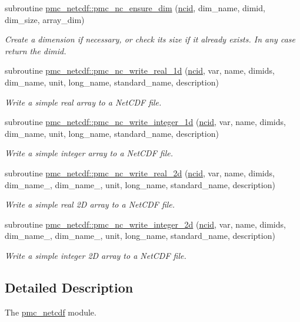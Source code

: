 \begin{DoxyCompactItemize}
subroutine \mbox{\hyperlink{namespacepmc__netcdf_aef9fac46c9e7632344fa29cfb6891f92}{pmc\+\_\+netcdf\+::pmc\+\_\+nc\+\_\+ensure\+\_\+dim}} (\mbox{\hyperlink{fractal_8_f90_a4e89f3f850921ff84a6dfce8b166ad50}{ncid}}, dim\+\_\+name, dimid, dim\+\_\+size, array\+\_\+dim)
\begin{DoxyCompactList}\small\item\em Create a dimension if necessary, or check its size if it already exists. In any case return the {\ttfamily dimid}. \end{DoxyCompactList}\item 
subroutine \mbox{\hyperlink{namespacepmc__netcdf_a8dc82ed2d6bf930ffd844ea41d821e4f}{pmc\+\_\+netcdf\+::pmc\+\_\+nc\+\_\+write\+\_\+real\+\_\+1d}} (\mbox{\hyperlink{fractal_8_f90_a4e89f3f850921ff84a6dfce8b166ad50}{ncid}}, var, name, dimids, dim\+\_\+name, unit, long\+\_\+name, standard\+\_\+name, description)
\begin{DoxyCompactList}\small\item\em Write a simple real array to a Net\+C\+DF file. \end{DoxyCompactList}\item 
subroutine \mbox{\hyperlink{namespacepmc__netcdf_ac0d23c48469031f1750e47f7742a78a5}{pmc\+\_\+netcdf\+::pmc\+\_\+nc\+\_\+write\+\_\+integer\+\_\+1d}} (\mbox{\hyperlink{fractal_8_f90_a4e89f3f850921ff84a6dfce8b166ad50}{ncid}}, var, name, dimids, dim\+\_\+name, unit, long\+\_\+name, standard\+\_\+name, description)
\begin{DoxyCompactList}\small\item\em Write a simple integer array to a Net\+C\+DF file. \end{DoxyCompactList}\item 
subroutine \mbox{\hyperlink{namespacepmc__netcdf_af7187da67199411890eafc1fa1cc0ab3}{pmc\+\_\+netcdf\+::pmc\+\_\+nc\+\_\+write\+\_\+real\+\_\+2d}} (\mbox{\hyperlink{fractal_8_f90_a4e89f3f850921ff84a6dfce8b166ad50}{ncid}}, var, name, dimids, dim\+\_\+name\+\_, dim\+\_\+name\+\_, unit, long\+\_\+name, standard\+\_\+name, description)
\begin{DoxyCompactList}\small\item\em Write a simple real 2D array to a Net\+C\+DF file. \end{DoxyCompactList}\item 
subroutine \mbox{\hyperlink{namespacepmc__netcdf_a948590db9b9b4f73c2da2cc1ed2af6aa}{pmc\+\_\+netcdf\+::pmc\+\_\+nc\+\_\+write\+\_\+integer\+\_\+2d}} (\mbox{\hyperlink{fractal_8_f90_a4e89f3f850921ff84a6dfce8b166ad50}{ncid}}, var, name, dimids, dim\+\_\+name\+\_, dim\+\_\+name\+\_, unit, long\+\_\+name, standard\+\_\+name, description)
\begin{DoxyCompactList}\small\item\em Write a simple integer 2D array to a Net\+C\+DF file. \end{DoxyCompactList}\end{DoxyCompactItemize}


\subsection{Detailed Description}
The \mbox{\hyperlink{namespacepmc__netcdf}{pmc\+\_\+netcdf}} module. 

